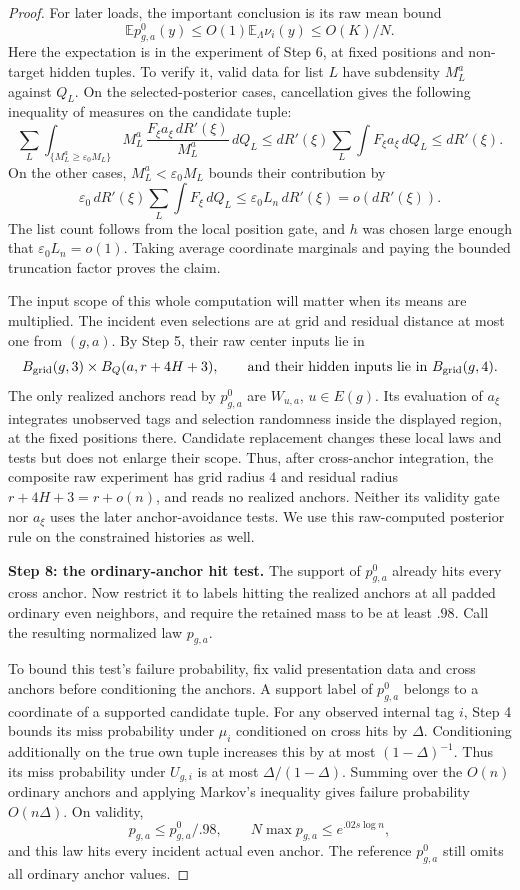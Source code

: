 \begin{proof}
For later loads, the important conclusion is its raw mean bound
\[
 \mathbb E p^0_{g,a}(y)
       \le O(1)\mathbb E_\Lambda\nu_i(y)\le O(K)/N.
\]
Here the expectation is in the experiment of Step 6, at fixed positions and non-target hidden tuples. To verify it, valid data for list \(L\) have subdensity \(M_L^a\) against \(Q_L\). On the selected-posterior cases, cancellation gives the following inequality of measures on the candidate tuple:
\[
 \sum_L\int_{\{M_L^a\ge\varepsilon_0M_L\}}
 M_L^a\,\frac{F_\xi a_\xi\,dR'(\xi)}{M_L^a}\,dQ_L
 \le dR'(\xi)\sum_L\int F_\xi a_\xi\,dQ_L
 \le dR'(\xi).
\]
On the other cases, \(M_L^a<\varepsilon_0M_L\) bounds their contribution by
\[
 \varepsilon_0\,dR'(\xi)\sum_L\int F_\xi\,dQ_L
 \le\varepsilon_0 L_n\,dR'(\xi)=o(dR'(\xi)).
\]
The list count follows from the local position gate, and \(h\) was chosen large enough that \(\varepsilon_0L_n=o(1)\). Taking average coordinate marginals and paying the bounded truncation factor proves the claim.

The input scope of this whole computation will matter when its means are multiplied. The incident even selections are at grid and residual distance at most one from \((g,a)\). By Step 5, their raw center inputs lie in
\[
 B_{\rm grid}(g,3)\times B_Q(a,r+4H+3),
 \qquad\text{and their hidden inputs lie in }B_{\rm grid}(g,4).
\]
The only realized anchors read by \(p^0_{g,a}\) are \(W_{u,a}\), \(u\in E(g)\). Its evaluation of \(a_\xi\) integrates unobserved tags and selection randomness inside the displayed region, at the fixed positions there. Candidate replacement changes these local laws and tests but does not enlarge their scope. Thus, after cross-anchor integration, the composite raw experiment has grid radius \(4\) and residual radius \(r+4H+3=r+o(n)\), and reads no realized anchors. Neither its validity gate nor \(a_\xi\) uses the later anchor-avoidance tests. We use this raw-computed posterior rule on the constrained histories as well.

\noindent\textbf{Step 8: the ordinary-anchor hit test.}\quad
The support of \(p^0_{g,a}\) already hits every cross anchor. Now restrict it to labels hitting the realized anchors at all padded ordinary even neighbors, and require the retained mass to be at least \(.98\). Call the resulting normalized law \(p_{g,a}\).

To bound this test's failure probability, fix valid presentation data and cross anchors before conditioning the anchors. A support label of \(p^0_{g,a}\) belongs to a coordinate of a supported candidate tuple. For any observed internal tag \(i\), Step 4 bounds its miss probability under \(\mu_i\) conditioned on cross hits by \(\Delta\). Conditioning additionally on the true own tuple increases this by at most \((1-\Delta)^{-1}\). Thus its miss probability under \(U_{g,i}\) is at most \(\Delta/(1-\Delta)\). Summing over the \(O(n)\) ordinary anchors and applying Markov's inequality gives failure probability \(O(n\Delta)\). On validity,
\[
 p_{g,a}\le p^0_{g,a}/.98,\qquad
 N\max p_{g,a}\le e^{.02s\log n},
\]
and this law hits every incident actual even anchor. The reference \(p^0_{g,a}\) still omits all ordinary anchor values.


\end{proof}
